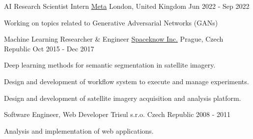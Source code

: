 

\begin{cventries}

  \cventry
    {AI Research Scientist Intern} %
    {\href{https://about.facebook.com}{Meta}} %
    {London, United Kingdom} %
    {Jun 2022 - Sep 2022} %
    {
      \begin{cvitems} %
        \item {Working on topics related to Generative Adversarial Networks (GANs)}
      \end{cvitems}
    }

\cventry
{Machine Learning Researcher \& Engineer} %
{\href{http://spaceknow.com}{Spaceknow Inc.}} %
{Prague, Czech Republic} %
{Oct 2015 - Dec 2017} %
{
	\begin{cvitems} %
		\item {Deep learning methods for semantic segmentation in satellite imagery. %
		}
		\item {Design and development of workflow system to execute and manage experiments.}
		\item {Design and development of satellite imagery acquisition and analysis platform. %
		}
	\end{cvitems}
}

\cventry
{Software Engineer, Web Developer} %
{Trisul s.r.o.} %
{Czech Republic} %
{2008 - 2011} %
{
	\begin{cvitems} %
		\item {Analysis and implementation of web applications. %
		}
	\end{cvitems}
}


\end{cventries}
